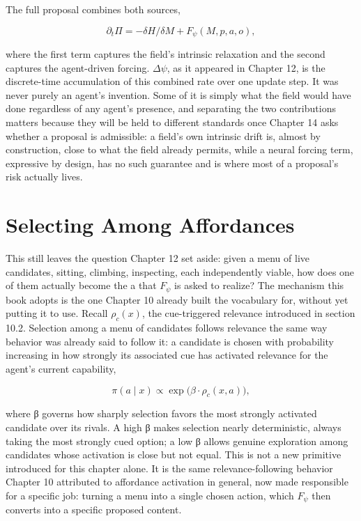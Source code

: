 The full proposal combines both sources,

\[ \partial_t \Pi = -\delta H/\delta M + F_\psi(M, p, a, o), \]

where the first term captures the field's intrinsic relaxation and the second captures the agent-driven forcing. \(\Delta\psi\), as it appeared in Chapter 12, is the discrete-time accumulation of this combined rate over one update step. It was never purely an agent's invention. Some of it is simply what the field would have done regardless of any agent's presence, and separating the two contributions matters because they will be held to different standards once Chapter 14 asks whether a proposal is admissible: a field's own intrinsic drift is, almost by construction, close to what the field already permits, while a neural forcing term, expressive by design, has no such guarantee and is where most of a proposal's risk actually lives.

\section{Selecting Among Affordances}

This still leaves the question Chapter 12 set aside: given a menu of live candidates, sitting, climbing, inspecting, each independently viable, how does one of them actually become the a that \(F_\psi\) is asked to realize? The mechanism this book adopts is the one Chapter 10 already built the vocabulary for, without yet putting it to use. Recall \(\rho_c(x)\), the cue-triggered relevance introduced in section 10.2. Selection among a menu of candidates follows relevance the same way behavior was already said to follow it: a candidate is chosen with probability increasing in how strongly its associated cue has activated relevance for the agent's current capability,

\[ \pi(a \mid x) \propto \exp\bigl(\beta \cdot \rho_c(x, a)\bigr), \]

where β governs how sharply selection favors the most strongly activated candidate over its rivals. A high β makes selection nearly deterministic, always taking the most strongly cued option; a low β allows genuine exploration among candidates whose activation is close but not equal. This is not a new primitive introduced for this chapter alone. It is the same relevance-following behavior Chapter 10 attributed to affordance activation in general, now made responsible for a specific job: turning a menu into a single chosen action, which \(F_\psi\) then converts into a specific proposed content.

